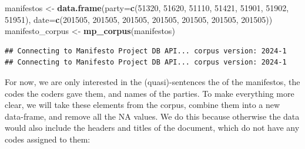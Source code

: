 \documentclass[
]{book}
\newenvironment{Shaded}{\begin{snugshade}}{\end{snugshade}}
\newcommand{\AttributeTok}[1]{\textcolor[rgb]{0.13,0.29,0.53}{#1}}
\newcommand{\DecValTok}[1]{\textcolor[rgb]{0.00,0.00,0.81}{#1}}
\newcommand{\FunctionTok}[1]{\textcolor[rgb]{0.13,0.29,0.53}{\textbf{#1}}}
\newcommand{\NormalTok}[1]{#1}
\newcommand{\OtherTok}[1]{\textcolor[rgb]{0.56,0.35,0.01}{#1}}
\begin{document}
\begin{Shaded}
\begin{Highlighting}[]
\NormalTok{manifestos }\OtherTok{\textless{}{-}} \FunctionTok{data.frame}\NormalTok{(}\AttributeTok{party=}\FunctionTok{c}\NormalTok{(}\DecValTok{51320}\NormalTok{, }\DecValTok{51620}\NormalTok{, }\DecValTok{51110}\NormalTok{, }\DecValTok{51421}\NormalTok{, }\DecValTok{51901}\NormalTok{, }\DecValTok{51902}\NormalTok{, }\DecValTok{51951}\NormalTok{), }\AttributeTok{date=}\FunctionTok{c}\NormalTok{(}\DecValTok{201505}\NormalTok{, }\DecValTok{201505}\NormalTok{, }\DecValTok{201505}\NormalTok{, }\DecValTok{201505}\NormalTok{, }\DecValTok{201505}\NormalTok{, }\DecValTok{201505}\NormalTok{, }\DecValTok{201505}\NormalTok{))}
\NormalTok{manifesto\_corpus }\OtherTok{\textless{}{-}} \FunctionTok{mp\_corpus}\NormalTok{(manifestos)}
\end{Highlighting}
\end{Shaded}

\begin{verbatim}
## Connecting to Manifesto Project DB API... corpus version: 2024-1 
## Connecting to Manifesto Project DB API... corpus version: 2024-1
\end{verbatim}

For now, we are only interested in the (quasi)-sentences the of the manifestos, the codes the coders gave them, and names of the parties. To make everything more clear, we will take these elements from the corpus, combine them into a new data-frame, and remove all the NA values. We do this because otherwise the data would also include the headers and titles of the document, which do not have any codes assigned to them:
\end{document}
